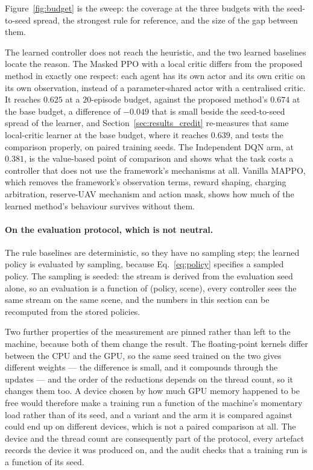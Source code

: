 \documentclass[conference]{IEEEtran}
\begin{document}
Figure~\ref{fig:budget} is the sweep: the coverage at the three budgets with the seed-to-seed spread, the strongest rule for reference, and the size of the gap between them.

The learned controller does not reach the heuristic, and the two learned
baselines locate the reason.  The Masked PPO with a local critic differs
from the proposed method in exactly one respect: each agent has its own
actor and its own critic on its own observation, instead of a
parameter-shared actor with a centralised critic.  It reaches
$0.625$ at a $20$-episode budget, against the proposed
method's $0.674$ at the base budget, a difference
of $-0.049$ that is small beside the seed-to-seed spread of the
learner, and Section~\ref{sec:results_credit} re-measures that same
local-critic learner at the base budget, where it reaches
$0.639$, and tests the comparison properly, on paired training
seeds.  The Independent DQN arm, at
$0.381$, is the value-based point of comparison and shows what the
task costs a controller that does not use the framework's mechanisms at
all.  Vanilla MAPPO, which removes the
framework's observation terms, reward shaping, charging arbitration,
reserve-UAV mechanism and action mask, shows how much of the learned
method's behaviour survives without them.

\paragraph{On the evaluation protocol, which is not neutral.} The rule
baselines are deterministic, so they have no sampling step; the learned
policy is evaluated by sampling, because Eq.~\eqref{eq:policy} specifies a
sampled policy.  The sampling is seeded: the stream is derived from the
evaluation seed alone, so an evaluation is a function of (policy, scene),
every controller sees the same stream on the same scene, and the numbers in
this section can be recomputed from the stored policies.

Two further properties of the measurement are pinned rather than left to
the machine, because both of them change the result.  The floating-point
kernels differ between the CPU and the GPU, so the same seed trained on
the two gives different weights --- the difference is small, and it
compounds through the updates --- and the order of the reductions depends
on the thread count, so it changes them too.  A device chosen by how much
GPU memory happened to be free would therefore make a training run a
function of the machine's momentary load rather than of its seed, and a
variant and the arm it is compared against could end up on different
devices, which is not a paired comparison at all.  The device and the
thread count are consequently part of the protocol, every artefact records
the device it was produced on, and the audit checks that a training run is
a function of its seed.
\end{document}

